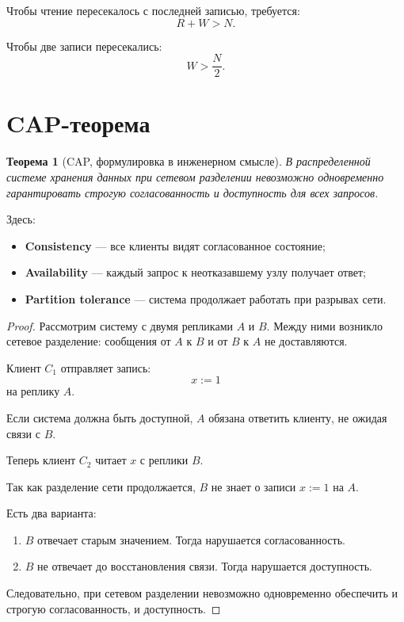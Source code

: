 \documentclass[12pt,a4paper]{article}
\newtheorem{theorem}{Теорема}
\begin{document}
Чтобы чтение пересекалось с последней записью, требуется:
\[
R + W > N.
\]

Чтобы две записи пересекались:
\[
W > \frac{N}{2}.
\]

\section{CAP-теорема}

\begin{theorem}[CAP, формулировка в инженерном смысле]
В распределенной системе хранения данных при сетевом разделении невозможно одновременно гарантировать строгую согласованность и доступность для всех запросов.
\end{theorem}

Здесь:
\begin{itemize}
    \item \textbf{Consistency} --- все клиенты видят согласованное состояние;
    \item \textbf{Availability} --- каждый запрос к неотказавшему узлу получает ответ;
    \item \textbf{Partition tolerance} --- система продолжает работать при разрывах сети.
\end{itemize}

\begin{proof}
Рассмотрим систему с двумя репликами $A$ и $B$. Между ними возникло сетевое разделение: сообщения от $A$ к $B$ и от $B$ к $A$ не доставляются.

Клиент $C_1$ отправляет запись:
\[
x := 1
\]
на реплику $A$.

Если система должна быть доступной, $A$ обязана ответить клиенту, не ожидая связи с $B$.

Теперь клиент $C_2$ читает $x$ с реплики $B$.

Так как разделение сети продолжается, $B$ не знает о записи $x := 1$ на $A$.

Есть два варианта:
\begin{enumerate}
    \item $B$ отвечает старым значением. Тогда нарушается согласованность.
    \item $B$ не отвечает до восстановления связи. Тогда нарушается доступность.
\end{enumerate}

Следовательно, при сетевом разделении невозможно одновременно обеспечить и строгую согласованность, и доступность.
\end{proof}
\end{document}
